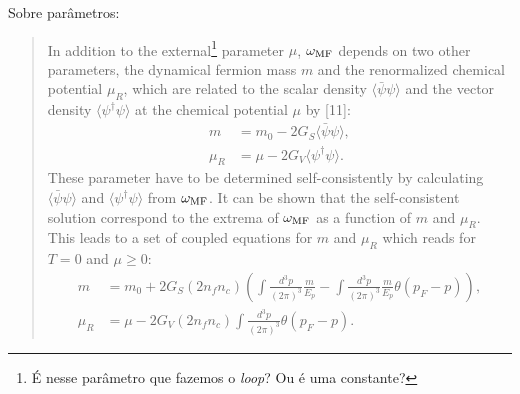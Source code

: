 Sobre parâmetros:
\begin{quote}
	In addition to the external\footnote{É nesse parâmetro que fazemos o \emph{loop}? Ou é uma constante?} parameter $\mu$, $\omega_{\rm{MF}}$ depends on two other parameters, the dynamical fermion mass $m$ and the renormalized chemical potential $\mu_R$, which are related to the scalar density $\langle\bar{\psi}\psi\rangle$ and the vector density $\langle\psi^\dagger\psi\rangle$ at the chemical potential $\mu$ by [11]:
	\begin{align}
		m &= m_0 - 2G_S\langle\bar{\psi}\psi\rangle, \label{Eq:Eq_Gap_Buballa_1}\\
		\mu_R &= \mu - 2G_V\langle\psi^\dagger\psi\rangle.
	\end{align}
	These parameter have to be determined self-consistently by calculating $\langle\bar{\psi}\psi\rangle$ and $\langle\psi^\dagger\psi\rangle$ from $\omega_{\rm{MF}}$. It can be shown that the self-consistent solution correspond to the extrema of $\omega_{\rm{MF}}$ as a function of $m$ and $\mu_R$. This leads to a set of coupled equations for $m$ and $\mu_R$ which reads for $T = 0$ and $\mu \geqslant 0$:
\begin{align}
	m &= m_0 + 2G_S(2n_fn_c)\left(\int \frac{d^3p}{(2\pi)^3} \frac{m}{E_p} - \int \frac{d^3p}{(2\pi)^3}\frac{m}{E_p}\theta(p_F - p)\right), \label{Eq:Eq_Gap_Buballa_2}\\
	\mu_R &= \mu - 2G_V(2n_fn_c)\int\frac{d^3p}{(2\pi)^3}\theta(p_F - p).
\end{align}
\end{quote}

